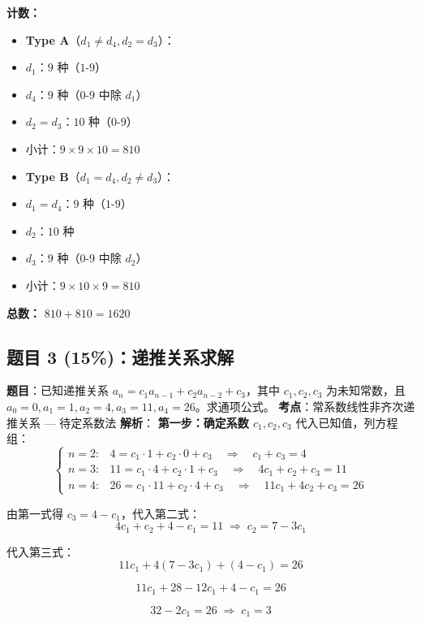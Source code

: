 \documentclass[10pt,a4paper,openany]{ctexbook}
\theoremstyle{definition}
\theoremstyle{remark}
\begin{document}
\textbf{计数：}
\begin{itemize}
\item \textbf{Type A}（$d_1 \neq d_4, d_2 = d_3$）：
\item $d_1$：$9$ 种（$1$-$9$）
\item $d_4$：$9$ 种（$0$-$9$ 中除 $d_1$）
\item $d_2 = d_3$：$10$ 种（$0$-$9$）
\item 小计：$9 \times 9 \times 10 = 810$

\item \textbf{Type B}（$d_1 = d_4, d_2 \neq d_3$）：
\item $d_1 = d_4$：$9$ 种（$1$-$9$）
\item $d_2$：$10$ 种
\item $d_3$：$9$ 种（$0$-$9$ 中除 $d_2$）
\item 小计：$9 \times 10 \times 9 = 810$

\end{itemize}

\textbf{总数：} $810 + 810 = \boxed{1620}$
\vspace{-2pt}

\subsection{题目 3 (15\%)：递推关系求解}

\textbf{题目}：已知递推关系 $a_n = c_1 a_{n-1} + c_2 a_{n-2} + c_3$，其中 $c_1, c_2, c_3$ 为未知常数，且 $a_0 = 0, a_1 = 1, a_2 = 4, a_3 = 11, a_4 = 26$。求通项公式。
\textbf{考点}：常系数线性非齐次递推关系 — 待定系数法
\textbf{解析}：
\textbf{第一步：确定系数 $c_1, c_2, c_3$}
代入已知值，列方程组：
\[
\begin{cases}
n=2: & 4 = c_1 \cdot 1 + c_2 \cdot 0 + c_3 \quad\Rightarrow\quad c_1 + c_3 = 4 \\
n=3: & 11 = c_1 \cdot 4 + c_2 \cdot 1 + c_3 \quad\Rightarrow\quad 4c_1 + c_2 + c_3 = 11 \\
n=4: & 26 = c_1 \cdot 11 + c_2 \cdot 4 + c_3 \quad\Rightarrow\quad 11c_1 + 4c_2 + c_3 = 26
\end{cases}
\]

由第一式得 $c_3 = 4 - c_1$，代入第二式：
\[
 4c_1 + c_2 + 4 - c_1 = 11 \;\Rightarrow\; c_2 = 7 - 3c_1 
\]

代入第三式：
\[
 11c_1 + 4(7 - 3c_1) + (4 - c_1) = 26 
\]

\[
 11c_1 + 28 - 12c_1 + 4 - c_1 = 26 
\]

\[
 32 - 2c_1 = 26 \;\Rightarrow\; c_1 = 3 
\]
\end{document}
